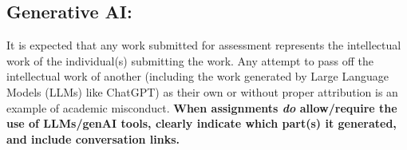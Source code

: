 \subsection*{Generative AI:}
It is expected that any work submitted for assessment represents 
the intellectual work of the individual(s) submitting the work. 
Any attempt to pass off the intellectual work of another 
(including the work generated by Large Language Models (LLMs) like ChatGPT) 
as their own or without proper attribution is an example of academic misconduct. 
\textbf{When assignments \emph{do} allow/require 
the use of LLMs/genAI tools, 
clearly indicate which part(s) it generated, and 
include conversation links.}

